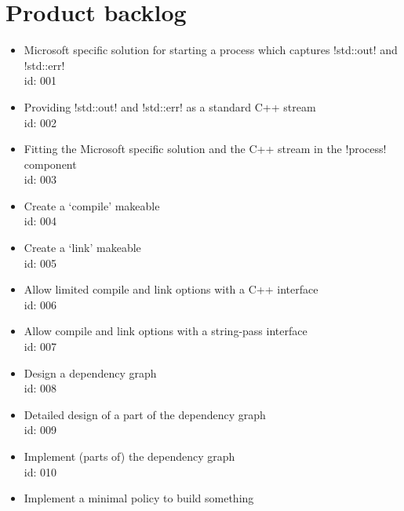 \chapter{Product backlog}
\label{sec:internship07.productbacklog}

\begin{itemize}
\item Microsoft specific solution for starting a process which captures !std::out! and !std::err! \\ 
      id: 001 \\
\item Providing !std::out! and !std::err! as a standard C++ stream \\ 
      id: 002 \\
\item Fitting the Microsoft specific solution and the C++ stream in the !process! component \\ 
      id: 003 \\
\item Create a `compile' makeable \\ 
      id: 004 \\
\item Create a `link' makeable \\ 
      id: 005 \\
\item Allow limited compile and link options with a C++ interface \\ 
      id: 006 \\
\item Allow compile and link options with a string-pass interface \\ 
      id: 007 \\
\item Design a dependency graph \\ 
      id: 008 \\
\item Detailed design of a part of the dependency graph \\ 
      id: 009 \\
\item Implement (parts of) the dependency graph \\ 
      id: 010 \\
\item Implement a minimal policy to build something \\ 

\end{itemize}

